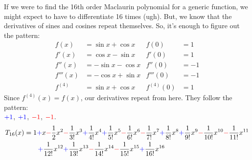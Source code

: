 \begin{solution}
If we were to find the 16th order Maclaurin polynomial for a generic function, we might expect to have to differentiate 16 times (ugh). But, we know that the derivatives of sines and cosines repeat themselves. So, it's enough to figure out the pattern:
\begin{align*}
f(x)&=\sin x + \cos x & f(0)&=1\\
f'(x)&=\cos x - \sin x & f'(0)&=1\\
f''(x)&=-\sin x - \cos x & f''(0)&=-1\\
f'''(x)&=-\cos x +\sin x & f'''(0)&=-1\\
f^{(4)}&=\sin x + \cos x & f^{(4)}(0)&=1
\end{align*}
Since $f^{(4)}(x)=f(x)$, our derivatives repeat from here. They follow the pattern:\\ $\textcolor{blue}{+1}$, $\textcolor{blue}{+1}$, $\textcolor{red}{-1}$, $\textcolor{red}{-1}$.
\begin{align*}
T_{16}(x)&=1\textcolor{blue}{+}x
\textcolor{red}{-}\frac{1}{2}x^2
\textcolor{red}{-}\frac{1}{3!}x^3
\textcolor{blue}{+}\frac{1}{4!}x^4
\textcolor{blue}{+}\frac{1}{5!}x^5
\textcolor{red}{-}\frac{1}{6!}x^6
\textcolor{red}{-}\frac{1}{7!}x^7
\textcolor{blue}{+}\frac{1}{8!}x^8
\textcolor{blue}{+}\frac{1}{9!}x^9
\textcolor{red}{-}\frac{1}{10!}x^{10}
\textcolor{red}{-}\frac{1}{11!}x^{11}\\
&\qquad\textcolor{blue}{+}\frac{1}{12!}x^{12}
\textcolor{blue}{+}\frac{1}{13!}x^{13}
\textcolor{red}{-}\frac{1}{14!}x^{14}
\textcolor{red}{-}\frac{1}{15!}x^{15}
\textcolor{blue}{+}\frac{1}{16!}x^{16}
\end{align*}
\end{solution}




